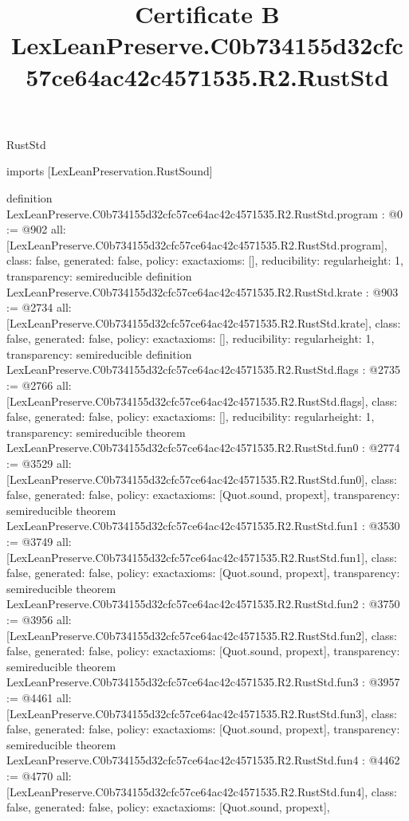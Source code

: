 \begin{lexlean}{RustStd}
\title{Certificate B LexLeanPreserve.C0b734155d32cfc57ce64ac42c4571535.R2.RustStd}
\begin{coremodule}
imports [LexLeanPreservation.RustSound]

definition LexLeanPreserve.C0b734155d32cfc57ce64ac42c4571535.R2.RustStd.program : @0 := @902 {
  all: [LexLeanPreserve.C0b734155d32cfc57ce64ac42c4571535.R2.RustStd.program],
  class: false,
  generated: false,
  policy: exact{axioms: []},
  reducibility: regular{height: 1},
  transparency: semireducible
}
definition LexLeanPreserve.C0b734155d32cfc57ce64ac42c4571535.R2.RustStd.krate : @903 := @2734 {
  all: [LexLeanPreserve.C0b734155d32cfc57ce64ac42c4571535.R2.RustStd.krate],
  class: false,
  generated: false,
  policy: exact{axioms: []},
  reducibility: regular{height: 1},
  transparency: semireducible
}
definition LexLeanPreserve.C0b734155d32cfc57ce64ac42c4571535.R2.RustStd.flags : @2735 := @2766 {
  all: [LexLeanPreserve.C0b734155d32cfc57ce64ac42c4571535.R2.RustStd.flags],
  class: false,
  generated: false,
  policy: exact{axioms: []},
  reducibility: regular{height: 1},
  transparency: semireducible
}
theorem LexLeanPreserve.C0b734155d32cfc57ce64ac42c4571535.R2.RustStd.fun0 : @2774 := @3529 {
  all: [LexLeanPreserve.C0b734155d32cfc57ce64ac42c4571535.R2.RustStd.fun0],
  class: false,
  generated: false,
  policy: exact{axioms: [Quot.sound, propext]},
  transparency: semireducible
}
theorem LexLeanPreserve.C0b734155d32cfc57ce64ac42c4571535.R2.RustStd.fun1 : @3530 := @3749 {
  all: [LexLeanPreserve.C0b734155d32cfc57ce64ac42c4571535.R2.RustStd.fun1],
  class: false,
  generated: false,
  policy: exact{axioms: [Quot.sound, propext]},
  transparency: semireducible
}
theorem LexLeanPreserve.C0b734155d32cfc57ce64ac42c4571535.R2.RustStd.fun2 : @3750 := @3956 {
  all: [LexLeanPreserve.C0b734155d32cfc57ce64ac42c4571535.R2.RustStd.fun2],
  class: false,
  generated: false,
  policy: exact{axioms: [Quot.sound, propext]},
  transparency: semireducible
}
theorem LexLeanPreserve.C0b734155d32cfc57ce64ac42c4571535.R2.RustStd.fun3 : @3957 := @4461 {
  all: [LexLeanPreserve.C0b734155d32cfc57ce64ac42c4571535.R2.RustStd.fun3],
  class: false,
  generated: false,
  policy: exact{axioms: [Quot.sound, propext]},
  transparency: semireducible
}
theorem LexLeanPreserve.C0b734155d32cfc57ce64ac42c4571535.R2.RustStd.fun4 : @4462 := @4770 {
  all: [LexLeanPreserve.C0b734155d32cfc57ce64ac42c4571535.R2.RustStd.fun4],
  class: false,
  generated: false,
  policy: exact{axioms: [Quot.sound, propext]},
}
\end{coremodule}
\end{lexlean}
